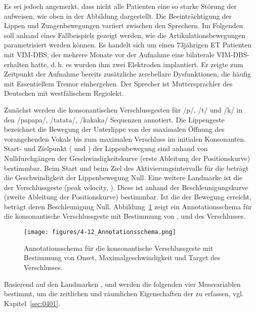     
Es sei jedoch angemerkt, dass nicht alle Patienten eine so starke Störung der  aufweisen, wie oben in der Abbildung dargestellt. Die Beeinträchtigung der Lippen und Zungenbewegungen variiert zwischen den Sprechern. Im Folgenden soll anhand eines Fallbeispiels gezeigt werden, wie die Artikulationsbewegungen parametrisiert werden können. Es handelt sich um einen 73jährigen ET Patienten mit VIM-DBS, der mehrere Monate vor der Aufnahme eine bilaterale VIM-DBS- erhalten hatte, d.\,h. es wurden ihm zwei Elektroden implantiert. Er zeigte zum Zeitpunkt der Aufnahme bereits zusätzliche zerebellare Dysfunktionen, die häufig mit Essentiellem Tremor einhergehen. Der Sprecher ist Muttersprachler des Deutschen mit westfälischem Regiolekt.

Zunächst werden die konsonantischen Verschlussgesten für /p/, /t/ und /k/ in den /papapa/, /tatata/, /kakaka/ Sequenzen annotiert. Die Lippengeste bezeichnet die Bewegung der Unterlippe von der maximalen Öffnung des vorangehenden Vokals bis zum maximalen Verschluss im initialen Konsonanten. Start- und Zielpunkt ( und ) der Lippenbewegung sind anhand von Nulldurchgängen der Geschwindigkeitskurve (erste Ableitung der Positionskurve) bestimmbar. Beim Start und beim Ziel des Aktivierungsintervalls für die  beträgt die Geschwindigkeit der Lippenbewegung Null. Eine weitere Landmarke ist die  der Verschlussgeste (peak velocity, ). Diese ist anhand der Beschleunigungskurve (zweite Ableitung der Positionskurve) bestimmbar. Ist die  der Bewegung erreicht, beträgt deren Beschleunigung Null. Abbildung~\ref{figure:0413} zeigt ein Annotationsschema für die konsonantische Verschlussgeste mit Bestimmung von ,  und  des Verschlusses.

\begin{figure}[t]
	\texttt{[image: figures/4-12\_Annotationsschema.png]}
	\caption{Annotationsschema für die konsonantische Verschlussgeste mit Bestimmung von Onset, Maximalgeschwindigkeit und Target des Verschlusses.}
	\label{figure:0413}
\end{figure}


Basierend auf den Landmarken ,  und  werden die folgenden vier Messvariablen bestimmt, um die zeitlichen und räumlichen Eigenschaften der  zu erfassen, vgl. Kapitel~\ref{sec:0401}.

